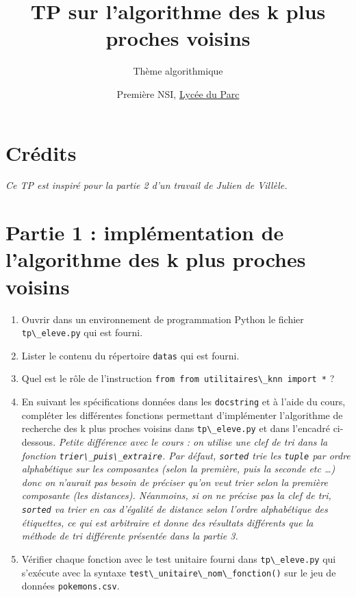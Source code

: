 \documentclass[
  11pt,
]{article}
\title{TP sur l'algorithme des k plus proches voisins}
\subtitle{Thème algorithmique}
\author{Première NSI, \href{https://frederic-junier.org/}{Lycée du Parc}}
\date{}
\newcommand{\passthrough}[1]{#1}
\providecommand{\tightlist}{%
  \setlength{\itemsep}{0pt}\setlength{\parskip}{0pt}}
\newcounter{thme}
\newcounter{def}
\newcounter{cours}
\newcounter{alg}
\newcounter{prog}
\begin{document}
\maketitle

\renewcommand*\contentsname{Table des matières}
{
\hypersetup{linkcolor=}
\setcounter{tocdepth}{3}
\tableofcontents
}
\hypertarget{cruxe9dits}{%
\section*{Crédits}\label{cruxe9dits}}

\emph{Ce TP est inspiré pour la partie 2 d'un travail de Julien de
Villèle.}

\hypertarget{partie-1-impluxe9mentation-de-lalgorithme-des-k-plus-proches-voisins}{%
\section{Partie 1 : implémentation de l'algorithme des k plus proches
voisins}\label{partie-1-impluxe9mentation-de-lalgorithme-des-k-plus-proches-voisins}}

\begin{enumerate}
\def\labelenumi{\arabic{enumi}.}
\tightlist
\item
  Ouvrir dans un environnement de programmation Python le fichier
  \passthrough{\lstinline!tp\_eleve.py!} qui est fourni.
\item
  Lister le contenu du répertoire \passthrough{\lstinline!datas!} qui
  est fourni.
\item
  Quel est le rôle de l'instruction
  \passthrough{\lstinline!from from utilitaires\_knn import *!} ?
\item
  En suivant les spécifications données dans les
  \passthrough{\lstinline!docstring!} et à l'aide du cours, compléter
  les différentes fonctions permettant d'implémenter l'algorithme de
  recherche des k plus proches voisins dans
  \passthrough{\lstinline!tp\_eleve.py!} et dans l'encadré ci-dessous.
  \emph{Petite différence avec le cours : on utilise une clef de tri
  dans la fonction \passthrough{\lstinline!trier\_puis\_extraire!}. Par
  défaut, \passthrough{\lstinline!sorted!} trie les
  \passthrough{\lstinline!tuple!} par ordre alphabétique sur les
  composantes (selon la première, puis la seconde etc \ldots{}) donc on
  n'aurait pas besoin de préciser qu'on veut trier selon la première
  composante (les distances). Néanmoins, si on ne précise pas la clef de
  tri, \passthrough{\lstinline!sorted!} va trier en cas d'égalité de
  distance selon l'ordre alphabétique des étiquettes, ce qui est
  arbitraire et donne des résultats différents que la méthode de tri
  différente présentée dans la partie 3.}
\item
  Vérifier chaque fonction avec le test unitaire fourni dans
  \passthrough{\lstinline!tp\_eleve.py!} qui s'exécute avec la syntaxe
  \passthrough{\lstinline!test\_unitaire\_nom\_fonction()!} sur le jeu
  de données \passthrough{\lstinline!pokemons.csv!}.
\end{enumerate}
\end{document}
